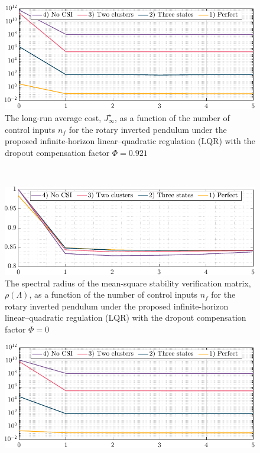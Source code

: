 \begin{bibunit}[alpha]
{\begin{figure}[h!]
\begin{center}
\end{center}
\end{figure}
\vspace*{10pt}
\begin{figure}[h!]
\begin{center}
\includegraphics[width=0.76\columnwidth]{cost-cntrl-9.pdf}
\caption{The long-run average cost, $J_{\infty}^{\star}$, as a function of the number of control inputs $n_f$ for the rotary inverted pendulum under the proposed infinite-horizon linear–quadratic regulation (LQR) with the dropout compensation factor $\mathit{\Phi}=0.921$}
\end{center}
\end{figure}\\
\newpage
\begin{figure}[h!]
\begin{center}
\includegraphics[width=0.76\columnwidth]{stability-cntrl-0.pdf}
\caption{The spectral radius of the mean-square stability verification matrix, $\rho(\mathit{\Lambda})$, as a function of the number of control inputs $n_f$ for the rotary inverted pendulum under the proposed infinite-horizon linear–quadratic regulation (LQR) with the dropout compensation factor $\mathit{\Phi}=0$}
\end{center}
\end{figure}
\begin{figure}[h!]
\begin{center}
\includegraphics[width=0.76\columnwidth]{cost-cntrl-0.pdf}

\end{center}
\end{figure}}
\end{bibunit}
